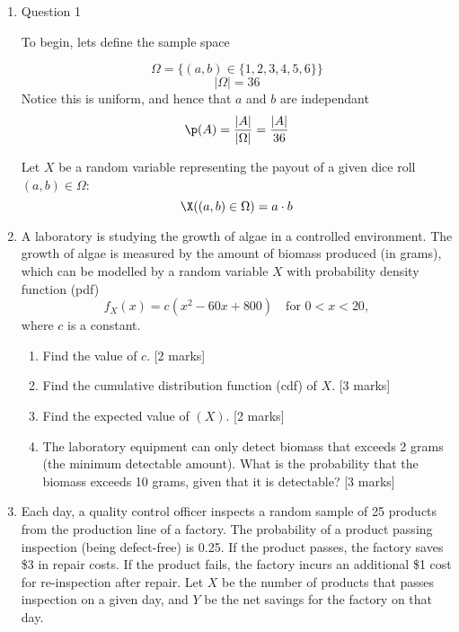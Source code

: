 \begin{enumerate}

\item Question 1

To begin, lets define the sample space

\[
\Omega = \{ (a, b) \in \{ 1, 2, 3, 4, 5, 6 \} \}
\]
\[
|\Omega| = 36
\]
Notice this is uniform, and hence that $a$ and $b$ are independant
\begin{equation}
\label{eq:q1-uniform-p}
\p (A) = \frac{|A|}{|\Omega|} = \frac{|A|}{36}
\end{equation}

Let $X$ be a random variable representing the payout of a given dice roll $(a,b)\in \Omega$:
\[
\X ((a,b) \in \Omega) = a \cdot b
\]


\vspace{0.5cm}

\item A laboratory is studying the growth of algae in a controlled environment. The growth of algae is measured by the amount of biomass produced (in grams), which can be modelled by a random variable $X$ with probability density function (pdf)
\[
		f_X(x) = c \left(x^2 - 60x + 800\right)
		\quad \text{for } 0<x<20,
\]
where $c$ is a constant.


\begin{enumerate}
\item Find the value of $c$.
\hfill [2 marks]

%
\item Find the cumulative distribution function (cdf) of $X$.
\hfill [3 marks]

%
\item Find the expected value of $(X)$.
\hfill [2 marks]

%
\item The laboratory equipment can only detect biomass that exceeds 2 grams (the minimum detectable amount). What is the probability that the biomass exceeds 10 grams, given that it is detectable?
\hfill [3 marks]

\end{enumerate}

\vspace{0.5cm}

\item Each day, a quality control officer inspects a random sample of 25 products from the production line of a factory. The probability of a product passing inspection (being defect-free) is 0.25. If the product passes, the factory saves \$3 in repair costs. If the product fails, the factory incurs an additional \$1 cost for re-inspection after repair.
Let $X$ be the number of products that passes inspection on a given day, and $Y$ be the net savings for the factory on that day.


\end{enumerate}
